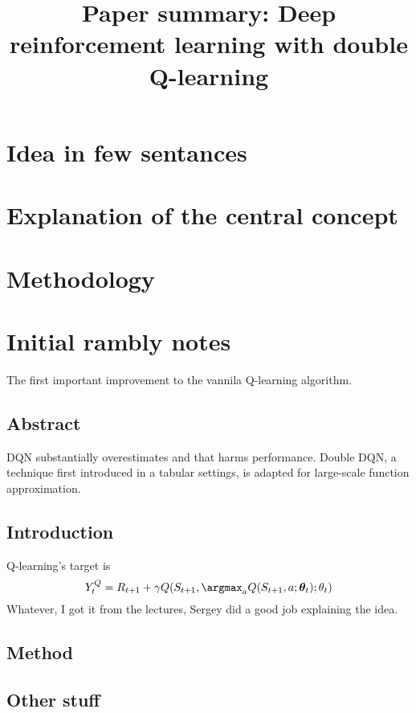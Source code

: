 \documentclass{article}
\title{Paper summary: Deep reinforcement learning with double Q-learning}
\begin{document}
\maketitle


\section{Idea in few sentances}



\section{Explanation of the central concept}




\section{Methodology}


\section{Initial rambly notes}
The first important improvement to the vannila Q-learning algorithm.


\subsection{Abstract}
DQN substantially overestimates and that harms performance.
Double DQN, a technique first introduced in a tabular settings, is adapted for large-scale function approximation.

\subsection{Introduction}
Q-learning's target is
\begin{equation}
		Y_{ t }^{ Q } = R_{ t+1 } + \gamma Q (S_{ t+1 }, \argmax_{a}Q (S_{ t+1 }, a; \bm{\theta}_{t}); \theta_{ t })
\end{equation}
Whatever, I got it from the lectures, Sergey did a good job explaining the idea.

\subsection{Method}

\subsection{Other stuff}
\end{document}
